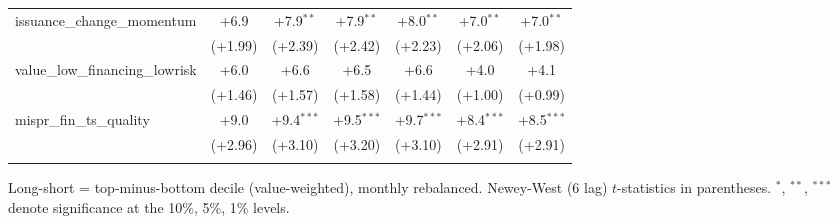 \begin{table}[htbp]
\begin{threeparttable}
\begin{tabular}{lcccccc}
\addlinespace
issuance\_change\_momentum & +6.9 & +7.9$^{**}$ & +7.9$^{**}$ & +8.0$^{**}$ & +7.0$^{**}$ & +7.0$^{**}$ \\
 & (+1.99) & (+2.39) & (+2.42) & (+2.23) & (+2.06) & (+1.98) \\
\addlinespace
value\_low\_financing\_lowrisk & +6.0 & +6.6 & +6.5 & +6.6 & +4.0 & +4.1 \\
 & (+1.46) & (+1.57) & (+1.58) & (+1.44) & (+1.00) & (+0.99) \\
\addlinespace
mispr\_fin\_ts\_quality & +9.0 & +9.4$^{***}$ & +9.5$^{***}$ & +9.7$^{***}$ & +8.4$^{***}$ & +8.5$^{***}$ \\
 & (+2.96) & (+3.10) & (+3.20) & (+3.10) & (+2.91) & (+2.91) \\
\addlinespace
\bottomrule
\end{tabular}
\begin{tablenotes}\footnotesize
\item Long-short = top-minus-bottom decile (value-weighted), monthly rebalanced. Newey-West (6 lag) $t$-statistics in parentheses. $^{*}$, $^{**}$, $^{***}$ denote significance at the 10\%, 5\%, 1\% levels.
\end{tablenotes}
\end{threeparttable}
\end{table}